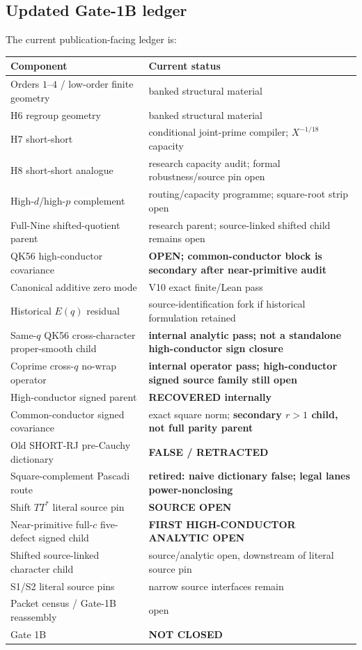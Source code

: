 \documentclass[11pt]{article}
\theoremstyle{definition}
\newcommand{\1}{\mathbf 1}
\begin{document}
\subsection{Updated Gate-1B ledger}
The current publication-facing ledger is:
\begin{center}
\begin{tabular}{p{}p{}}
\toprule
Component & Current status\\
\midrule
Orders $1$--$4$ / low-order finite geometry & banked structural material\\
H6 regroup geometry & banked structural material\\
H7 short-short & conditional joint-prime compiler; $X^{-1/18}$ capacity\\
H8 short-short analogue & research capacity audit; formal robustness/source pin open\\
High-$d$/high-$p$ complement & routing/capacity programme; square-root strip open\\
Full-Nine shifted-quotient parent & research parent; source-linked shifted child remains open\\
QK56 high-conductor covariance & \textbf{OPEN; common-conductor block is secondary after near-primitive audit}\\
Canonical additive zero mode & V10 exact finite/Lean pass\\
Historical $E(q)$ residual & source-identification fork if historical formulation retained\\
Same-$q$ QK56 cross-character proper-smooth child & \textbf{internal analytic pass; not a standalone high-conductor sign closure}\\
Coprime cross-$q$ no-wrap operator & \textbf{internal operator pass; high-conductor signed source family still open}\\
High-conductor signed parent & \textbf{RECOVERED internally}\\
Common-conductor signed covariance & exact square norm; \textbf{secondary $r>1$ child, not full parity parent}\\
Old SHORT-RJ pre-Cauchy dictionary & \textbf{FALSE / RETRACTED}\\
Square-complement Pascadi route & \textbf{retired: naive dictionary false; legal lanes power-nonclosing}\\
Shift $TT^*$ literal source pin & \textbf{SOURCE OPEN}\\
Near-primitive full-$c$ five-defect signed child & \textbf{FIRST HIGH-CONDUCTOR ANALYTIC OPEN}\\
Shifted source-linked character child & source/analytic open, downstream of literal source pin\\
S1/S2 literal source pins & narrow source interfaces remain\\
Packet census / Gate-1B reassembly & open\\
Gate 1B & \textbf{NOT CLOSED}\\
\bottomrule
\end{tabular}
\end{center}
\end{document}
